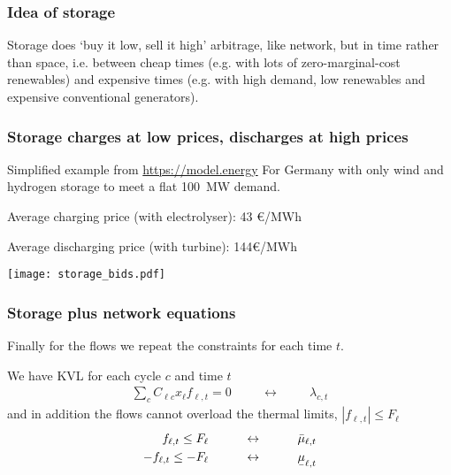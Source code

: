 \documentclass[10pt,aspectratio=169,dvipsnames]{beamer}
\def\l{\lambda}
\def\m{\mu}
\newcommand{\ubar}[1]{\text{\b{$#1$}}}
\begin{document}
\begin{frame}[fragile]
  \frametitle{Idea of storage}


  Storage does `buy it low, sell it high' arbitrage, like network, but
  in time rather than space, i.e. between cheap times (e.g. with lots
  of zero-marginal-cost renewables) and expensive times (e.g. with
  high demand, low renewables and expensive conventional generators).



\end{frame}



\begin{frame}[fragile]
  \frametitle{Storage charges at low prices, discharges at high prices}

  Simplified example from \url{https://model.energy} For Germany with only wind and hydrogen storage to meet a flat 100~MW demand.

  Average charging price (with electrolyser): 43 \euro/MWh

  Average discharging price (with turbine): 144\euro/MWh

    \centering \texttt{[image: storage\_bids.pdf]}



\end{frame}



\begin{frame}[fragile]
  \frametitle{Storage plus network equations}



  Finally for the flows we repeat the constraints for each time $t$.

  We have KVL for each cycle $c$ and time $t$
  \begin{align*}
    \sum_{c} C_{\ell c} x_\ell f_{\ell,t} = 0  \hspace{1cm}\leftrightarrow\hspace{1cm} \l_{c,t}
  \end{align*}
  and in addition the flows cannot overload the thermal limits, $|f_{\ell,t}| \leq F_\ell$
  \begin{align*}
    f_{\ell,t} \leq F_\ell  \hspace{1cm}\leftrightarrow\hspace{1cm} \bar{\m}_{\ell,t} \\
        - f_{\ell,t} \leq - F_\ell  \hspace{1cm}\leftrightarrow\hspace{1cm} \ubar{\m}_{\ell,t}
  \end{align*}

\end{frame}
\end{document}
